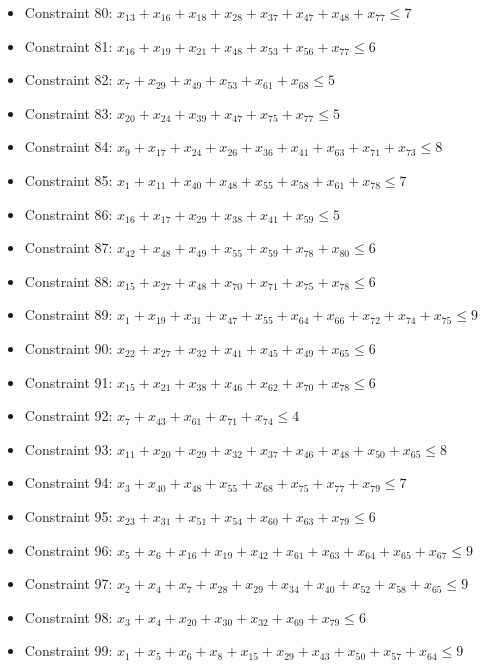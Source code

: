 \documentclass[11pt]{article}
\begin{document}
\begin{itemize}
\item Constraint 80: $x_{13} + x_{16} + x_{18} + x_{28} + x_{37} + x_{47} + x_{48} + x_{77} \le 7$
\item Constraint 81: $x_{16} + x_{19} + x_{21} + x_{48} + x_{53} + x_{56} + x_{77} \le 6$
\item Constraint 82: $x_{7} + x_{29} + x_{49} + x_{53} + x_{61} + x_{68} \le 5$
\item Constraint 83: $x_{20} + x_{24} + x_{39} + x_{47} + x_{75} + x_{77} \le 5$
\item Constraint 84: $x_{9} + x_{17} + x_{24} + x_{26} + x_{36} + x_{41} + x_{63} + x_{71} + x_{73} \le 8$
\item Constraint 85: $x_{1} + x_{11} + x_{40} + x_{48} + x_{55} + x_{58} + x_{61} + x_{78} \le 7$
\item Constraint 86: $x_{16} + x_{17} + x_{29} + x_{38} + x_{41} + x_{59} \le 5$
\item Constraint 87: $x_{42} + x_{48} + x_{49} + x_{55} + x_{59} + x_{78} + x_{80} \le 6$
\item Constraint 88: $x_{15} + x_{27} + x_{48} + x_{70} + x_{71} + x_{75} + x_{78} \le 6$
\item Constraint 89: $x_{1} + x_{19} + x_{31} + x_{47} + x_{55} + x_{64} + x_{66} + x_{72} + x_{74} + x_{75} \le 9$
\item Constraint 90: $x_{22} + x_{27} + x_{32} + x_{41} + x_{45} + x_{49} + x_{65} \le 6$
\item Constraint 91: $x_{15} + x_{21} + x_{38} + x_{46} + x_{62} + x_{70} + x_{78} \le 6$
\item Constraint 92: $x_{7} + x_{43} + x_{61} + x_{71} + x_{74} \le 4$
\item Constraint 93: $x_{11} + x_{20} + x_{29} + x_{32} + x_{37} + x_{46} + x_{48} + x_{50} + x_{65} \le 8$
\item Constraint 94: $x_{3} + x_{40} + x_{48} + x_{55} + x_{68} + x_{75} + x_{77} + x_{79} \le 7$
\item Constraint 95: $x_{23} + x_{31} + x_{51} + x_{54} + x_{60} + x_{63} + x_{79} \le 6$
\item Constraint 96: $x_{5} + x_{6} + x_{16} + x_{19} + x_{42} + x_{61} + x_{63} + x_{64} + x_{65} + x_{67} \le 9$
\item Constraint 97: $x_{2} + x_{4} + x_{7} + x_{28} + x_{29} + x_{34} + x_{40} + x_{52} + x_{58} + x_{65} \le 9$
\item Constraint 98: $x_{3} + x_{4} + x_{20} + x_{30} + x_{32} + x_{69} + x_{79} \le 6$
\item Constraint 99: $x_{1} + x_{5} + x_{6} + x_{8} + x_{15} + x_{29} + x_{43} + x_{50} + x_{57} + x_{64} \le 9$

\end{itemize}
\end{document}
